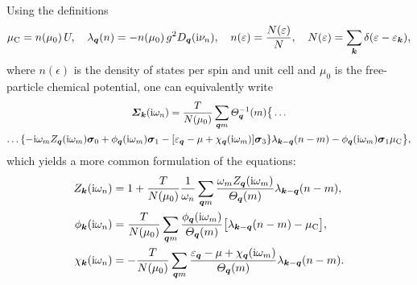Using the definitions \cite{MargineGiustino13}
%
\begin{align*}
    \mu \sb{\text{C}} = n(\mu_0) \, U,
        \quad
    \lambda_{\boldsymbol q}(n) = -n(\mu_0) \, g^2 D_{\boldsymbol q}(\mathrm i \nu_n),
        \quad
    n(\varepsilon) = \frac{N(\varepsilon)} N,
        \quad
    N(\varepsilon) = \sum_{\boldsymbol k} \delta(\varepsilon - \varepsilon_{\boldsymbol k}),
\end{align*}
%
where $n(\epsilon)$ is the density of states per spin and unit cell and $\mu_0$
is the free-particle chemical potential, one can equivalently write
%
\begin{multline*}
    \boldsymbol {\varSigma}_{\boldsymbol k} (\mathrm i \omega_n)
    = \frac T {N(\mu_0)} \sum_{\boldsymbol q m}
    \varTheta_{\boldsymbol q}^{-1}(m) \big \{ \dots
        \\
        \dots \{
            - \mathrm i \omega_m Z_{\boldsymbol q}(\mathrm i \omega_m) \boldsymbol \sigma_0
            + \phi_{\boldsymbol q}(\mathrm i \omega_m) \boldsymbol \sigma_1
            - [\varepsilon_{\boldsymbol q} - \mu + \chi_{\boldsymbol q}(\mathrm i \omega_m)]
            \boldsymbol \sigma_3
            \}
        \lambda_{\boldsymbol k - \boldsymbol q}(n - m)
        - \phi_{\boldsymbol q}(\mathrm i \omega_m) \boldsymbol \sigma_1 \mu \sb{\text{C}}
    \big \},
\end{multline*}
%
which yields a more common formulation of the  equations:
%
\begin{subequations} \label{Eliashberg equations}
    \begin{align}
        Z_{\boldsymbol k}(\mathrm i \omega_n) &= 1 + \frac T {N(\mu_0)} \frac 1 {\omega_n}
        \sum_{\boldsymbol q m} \frac
            {\omega_m Z_{\boldsymbol q}(\mathrm i \omega_m)}
            {\varTheta_{\boldsymbol q}(m)}
        \lambda_{\boldsymbol k - \boldsymbol q}(n - m),
        \\
        \phi_{\boldsymbol k}(\mathrm i \omega_n) &= \frac T {N(\mu_0)}
        \sum_{\boldsymbol q m} \frac
            {\phi_{\boldsymbol q}(\mathrm i \omega_m)}
            {\varTheta_{\boldsymbol q}(m)}
        \big[
            \lambda_{\boldsymbol k - \boldsymbol q}(n - m) - \mu \sb{\text{C}}
        \big],
        \\
        \chi_{\boldsymbol k}(\mathrm i \omega_n) &= -\frac T {N(\mu_0)}
        \sum_{\boldsymbol q m} \frac
            {\varepsilon_{\boldsymbol q} - \mu + \chi_{\boldsymbol q}(\mathrm i \omega_m)}
            {\varTheta_{\boldsymbol q}(m)}
        \lambda_{\boldsymbol k - \boldsymbol q}(n - m).
    \end{align}
\end{subequations}

